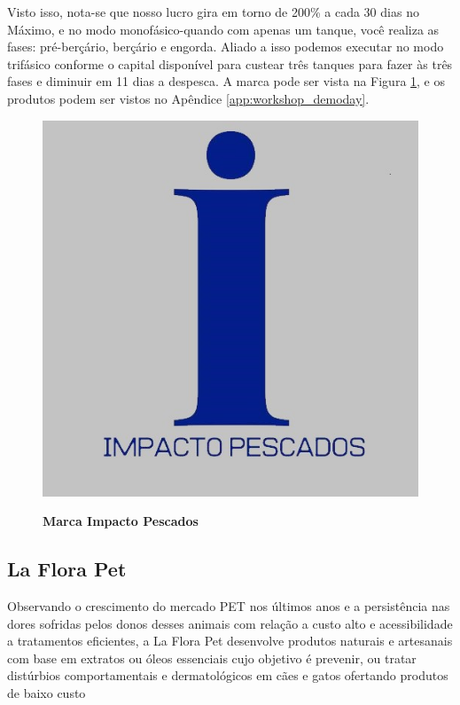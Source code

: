 Visto isso, nota-se que nosso lucro gira em torno de 200\% a cada 30 dias no Máximo, e  no modo monofásico-quando com apenas um tanque, você realiza  as fases: pré-berçário, berçário e engorda. Aliado a isso podemos executar no modo trifásico conforme o capital disponível para custear três tanques para fazer às três fases e diminuir em 11 dias a despesca.  A marca pode ser vista na Figura \ref{figura_23}, e os produtos podem ser vistos no Apêndice \ref{app:workshop_demoday}.

\begin{figure}[H]
\centering
\caption{\textbf{Marca Impacto Pescados}}
\includegraphics[scale=0.3]{Imagens/impacto_pescados.jpg}
\label{figura_23}
\end{figure}


\subsection{La Flora Pet}

Observando o crescimento do mercado PET nos últimos anos e a persistência nas dores sofridas pelos donos desses animais com relação a custo alto e acessibilidade a tratamentos eficientes, a La Flora Pet desenvolve produtos naturais e artesanais com base em extratos ou óleos essenciais cujo objetivo é prevenir, ou tratar distúrbios comportamentais e dermatológicos em cães e gatos ofertando produtos de baixo custo

